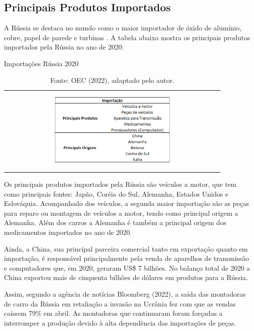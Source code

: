 \documentclass[12pt]{article}
\begin{document}
\subsection{Principais Produtos Importados} 

A Rússia se destaca no mundo como o maior importador de óxido de alumínio, cobre, papel de parede e turbinas \cite{oecRussia22}. A tabela abaixo mostra os principais produtos importados pela Rússia no ano de 2020:

\begin{table}[H]
    \begin{center}
        \caption{Importações Rússia 2020}
        \begin{tabular}{c}
            \includegraphics[width=0.6\textwidth]{imp rus.png}
        \end{tabular}
        \label{imprus}
        \caption*{Fonte: OEC (2022), adaptado pelo autor.}
    \end{center}
\end{table}

Os principais produtos importados pela Rússia são veículos a motor, que tem como principais fontes: Japão, Coréia do Sul, Alemanha, Estados Unidos e Eslováquia. Acompanhado dos veículos, a segunda maior importação são as peças para reparo ou montagem de veículos a motor, tendo como principal origem a Alemanha. Além dos carros a Alemanha é também a principal origem dos medicamentos importados no ano de 2020.

Ainda, a China, sua principal parceira comercial tanto em exportação quanto em importação, é responsável principalmente pela venda de aparelhos de transmissão e computadores que, em 2020, geraram US\$ 7 bilhões. No balanço total de 2020 a China exportou mais de cinquenta bilhões de dólares em produtos para a Rússia.

Assim, segundo a agência de notícias Bloomberg (2022), a saída das montadoras de carro da Rússia em retaliação a invasão na Ucrânia fez com que as vendas caíssem 79\% em abril. As montadoras que continuaram foram forçadas a interromper a produção devido à alta dependência das importações de peças.
\end{document}
